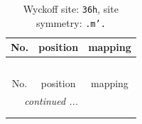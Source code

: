 \documentclass[fleqn,8pt]{jsarticle}
\begin{document}
\renewcommand{\arraystretch}{1.2}
\begin{longtable}{ccc}
\caption{Wyckoff site: {\tt 36h}, site symmetry: {\tt .m'.}}
 \\
 \hline \hline
No. & position & mapping \\ \hline \endfirsthead

\multicolumn{2}{l}{\tablename\ \thetable{}} \\
 \hline \hline
No. & position & mapping \\ \hline \endhead

 \hline \hline
\multicolumn{2}{r}{\footnotesize\it continued ...} \\ \endfoot

 \hline \hline
\multicolumn{2}{r}{} \\ \endlastfoot


\end{longtable}
\end{document}

